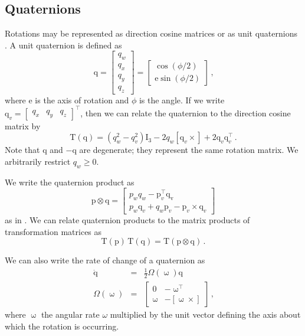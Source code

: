 \documentclass[12pt]{article}
\newcommand{\skewsymm}[1]{\ensuremath{\left[ #1 \times \right]}}
\newcommand{\eye}{\ensuremath{\mathrm{I}}}
\begin{document}
\subsection{Quaternions}
Rotations may be represented as direction cosine matrices or as unit quaternions \citep{Markley2003}. A unit quaternion is defined as
\begin{equation}
\mathrm{q} = \begin{bmatrix}%
q_w \\
q_x \\
q_y \\
q_z\end{bmatrix} = \begin{bmatrix}\cos(\phi / 2) \\
\mathrm{e} \sin(\phi / 2) \end{bmatrix}\,\text{,}\label{eq:quaternion}
\end{equation}
where $\mathrm{e}$ is the axis of rotation and $\phi$ is the angle. If we write $\mathrm{q}_v = \begin{bmatrix}q_x & q_y & q_z\end{bmatrix}^\top$, then we can relate the quaternion to the direction cosine matrix by
\begin{equation}
\mathrm{T}(\mathrm{q}) = \left(q_w^2 - q_v^2\right)\eye_3 - 2 q_w \skewsymm{\mathrm{q}_v} + 2\mathrm{q}_v\mathrm{q}_v^\top\,\text{.}
\end{equation}
Note that $\mathrm{q}$ and $-\mathrm{q}$ are degenerate; they represent the same rotation matrix. We arbitrarily restrict $q_w \geq 0$.

We write the quaternion product as
\begin{equation}
\mathrm{p} \otimes \mathrm{q} = \begin{bmatrix}p_w q_w - \mathrm{p}_v^\top\mathrm{q_v} \\
p_w \mathrm{q}_v + q_w \mathrm{p}_v - \mathrm{p}_v \times \mathrm{q}_v\end{bmatrix}
\end{equation}
as in \citet{Shuster1993}. We can relate quaternion products to the matrix products of transformation matrices as
\begin{equation}
\mathrm{T}(\mathrm{p})\, \mathrm{T}(\mathrm{q}) = \mathrm{T}(\mathrm{p} \otimes \mathrm{q})\,\text{.}
\end{equation}

We can also write the rate of change of a quaternion as
\begin{eqnarray}
\dot{\mathrm{q}} &=& \frac{1}{2}\Omega(\upomega) \mathrm{q} \\
\Omega(\upomega) &=& \begin{bmatrix} 0 & -\upomega^\top \\
\upomega & -\skewsymm{\upomega}\end{bmatrix}\,\text{,}\label{eq:qdot}
\end{eqnarray}
where $\upomega$ the angular rate $\omega$ multiplied by the unit vector defining the axis about which the rotation is occurring.
\end{document}
